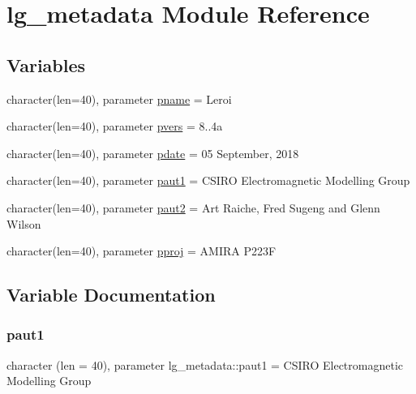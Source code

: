 \hypertarget{namespacelg__metadata}{}\section{lg\+\_\+metadata Module Reference}
\label{namespacelg__metadata}
\subsection*{Variables}
\begin{DoxyCompactItemize}
\item 
character(len=40), parameter \hyperlink{namespacelg__metadata_a55e96053795f7d02e8bbe4de8d6285c4}{pname} = \textquotesingle{}Leroi\textquotesingle{}
\item 
character(len=40), parameter \hyperlink{namespacelg__metadata_ac903068c6379390ca35b58c1a7e92078}{pvers} = \textquotesingle{}8..\+4a\textquotesingle{}
\item 
character(len=40), parameter \hyperlink{namespacelg__metadata_a337b7eb616ab5604cf3aa962030f7d07}{pdate} = \textquotesingle{}05 September, 2018\textquotesingle{}
\item 
character(len=40), parameter \hyperlink{namespacelg__metadata_a90d24b12239be94130b3edf2d1ff5b6c}{paut1} = \textquotesingle{}C\+S\+I\+RO Electromagnetic Modelling Group\textquotesingle{}
\item 
character(len=40), parameter \hyperlink{namespacelg__metadata_a11648f65295df5ce798120d00e06cba9}{paut2} = \textquotesingle{}Art Raiche, Fred Sugeng and Glenn Wilson\textquotesingle{}
\item 
character(len=40), parameter \hyperlink{namespacelg__metadata_ad73468f9426cf993204325cabad1cf55}{pproj} = \textquotesingle{}A\+M\+I\+RA P223F\textquotesingle{}
\end{DoxyCompactItemize}


\subsection{Variable Documentation}
\mbox{\label{namespacelg__metadata_a90d24b12239be94130b3edf2d1ff5b6c}} 
\subsubsection{\texorpdfstring{paut1}{paut1}}
{\footnotesize\ttfamily character (len = 40), parameter lg\+\_\+metadata\+::paut1 = \textquotesingle{}C\+S\+I\+RO Electromagnetic Modelling Group\textquotesingle{}}

